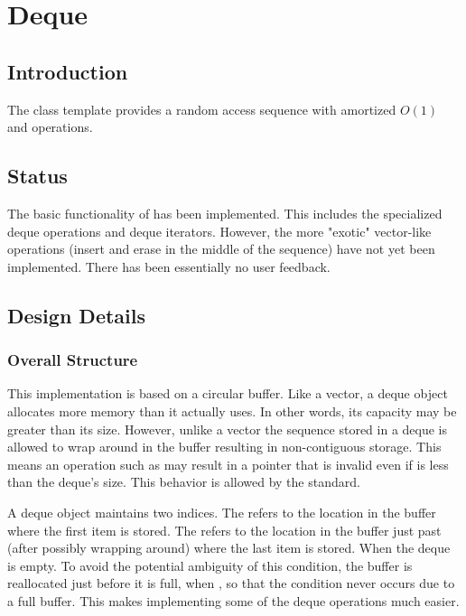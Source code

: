 
\chapter{Deque}

\section{Introduction}

The class template  provides a random access sequence with
amortized \(O(1)\)  and  operations.

\section{Status}

The basic functionality of  has been implemented. This
includes the specialized deque operations and deque iterators. However, the
more "exotic" vector-like operations (insert and erase in the middle of the
sequence) have not yet been implemented. There has been essentially no user
feedback.

\section{Design Details}

\subsection{Overall Structure}

This implementation is based on a circular buffer. Like a vector, a deque
object allocates more memory than it actually uses. In other words, its
capacity may be greater than its size. However, unlike a vector the sequence
stored in a deque is allowed to wrap around in the buffer resulting in
non-contiguous storage. This means an operation such as  may
result in a pointer that is invalid even if  is less than the deque's
size. This behavior is allowed by the standard. 

A deque object maintains two indices. The  refers to the
location in the buffer where the first item is stored. The 
refers to the location in the buffer just past (after possibly wrapping
around) where the last item is stored. When 
the deque is empty. To avoid the potential ambiguity of this condition, the
buffer is reallocated just before it is full, when , so that the condition  never
occurs due to a full buffer. This makes implementing some of the deque
operations much easier.

